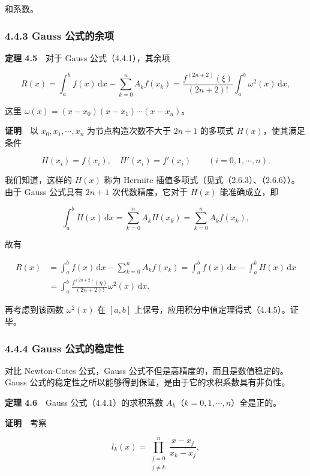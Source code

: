 和系数。

\subsubsection{4.4.3 Gauss 公式的余项}\label{ch04b-gauss-ux516cux5f0fux7684ux4f59ux9879}

\textbf{定理 4.5}　对于 Gauss 公式（4.4.1），其余项

\[
R(x)=\int_a^b f(x)\,\mathrm{d}x-\sum_{k=0}^{n}A_kf(x_k)
=\frac{f^{(2n+2)}(\xi)}{(2n+2)!}\int_a^b\omega^2(x)\,\mathrm{d}x,
\tag{4.4.5}
\]

这里 \(\omega(x)=(x-x_0)(x-x_1)\cdots(x-x_n)\)。

\textbf{证明}　以 \(x_0,x_1,\cdots,x_n\) 为节点构造次数不大于 \(2n+1\) 的多项式 \(H(x)\)，使其满足条件

\[
H(x_i)=f(x_i),\quad H'(x_i)=f'(x_i)\qquad(i=0,1,\cdots,n).
\]

我们知道，这样的 \(H(x)\) 称为 Hermite 插值多项式（见式（2.6.3）、（2.6.6））。由于 Gauss 公式具有 \(2n+1\) 次代数精度，它对于 \(H(x)\) 能准确成立，即

\[
\int_a^b H(x)\,\mathrm{d}x
=\sum_{k=0}^{n}A_kH(x_k)=\sum_{k=0}^{n}A_kf(x_k),
\]

故有

\[
\begin{aligned}
R(x)&=\int_a^b f(x)\,\mathrm{d}x-\sum_{k=0}^{n}A_kf(x_k)
=\int_a^b f(x)\,\mathrm{d}x-\int_a^b H(x)\,\mathrm{d}x\\
&=\int_a^b\frac{f^{(2n+2)}(\eta)}{(2n+2)!}\omega^2(x)\,\mathrm{d}x.
\end{aligned}
\]

再考虑到该函数 \(\omega^2(x)\) 在 \([a,b]\) 上保号，应用积分中值定理得式（4.4.5）。证毕。

\subsubsection{4.4.4 Gauss 公式的稳定性}\label{ch04b-gauss-ux516cux5f0fux7684ux7a33ux5b9aux6027}

对比 Newton-Cotes 公式，Gauss 公式不但是高精度的，而且是数值稳定的。Gauss 公式的稳定性之所以能够得到保证，是由于它的求积系数具有非负性。

\textbf{定理 4.6}　Gauss 公式（4.4.1）的求积系数 \(A_k\)（\(k=0,1,\cdots,n\)）全是正的。

\textbf{证明}　考察

\[
l_k(x)=\prod_{\substack{j=0\\j\ne k}}^{n}\frac{x-x_j}{x_k-x_j},
\]

